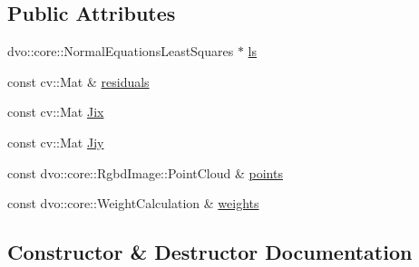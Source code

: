 \subsection*{Public Attributes}
\begin{DoxyCompactItemize}
\item 
dvo\+::core\+::\+Normal\+Equations\+Least\+Squares $\ast$ \mbox{\hyperlink{structdvo_1_1_least_squares_equations_reduction_a3af436ffa51a579212c4e1e913a4350b}{ls}}
\item 
const cv\+::\+Mat \& \mbox{\hyperlink{structdvo_1_1_least_squares_equations_reduction_a6140e6f4c600016951877b7f79efeec1}{residuals}}
\item 
const cv\+::\+Mat \mbox{\hyperlink{structdvo_1_1_least_squares_equations_reduction_a513436c876416261efe1d99188f8117a}{Jix}}
\item 
const cv\+::\+Mat \mbox{\hyperlink{structdvo_1_1_least_squares_equations_reduction_a7d8b6e08f0baf9580e0d5eb00776911f}{Jiy}}
\item 
const dvo\+::core\+::\+Rgbd\+Image\+::\+Point\+Cloud \& \mbox{\hyperlink{structdvo_1_1_least_squares_equations_reduction_a31ca8e056a271c3f3c99140e679a55c1}{points}}
\item 
const dvo\+::core\+::\+Weight\+Calculation \& \mbox{\hyperlink{structdvo_1_1_least_squares_equations_reduction_a135763297b1e3bcee21189e0f5014fe4}{weights}}
\end{DoxyCompactItemize}


\subsection{Constructor \& Destructor Documentation}
\mbox{\label{structdvo_1_1_least_squares_equations_reduction_ae69114a4911fd35ce60a4696d15ce5a1}} 
